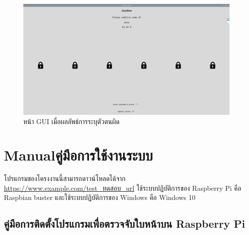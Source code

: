 \begin{figure}[!ht]
    \begin{center}
      \includegraphics[scale=.35]{pic/comfirm_page.png}
      \caption[หน้า GUI เมื่อผลลัพธ์การระบุตัวตนผิด]{หน้า GUI เมื่อผลลัพธ์การระบุตัวตนผิด}
      \label{fig:com_page}
    \end{center}
  \end{figure}
















\chapter{\ifenglish Manual\else คู่มือการใช้งานระบบ\fi}

โปรแกรมของโครงงานนี้สามารถดาวน์โหลดได้จาก \url{https://www.example.com/test_ทดสอบ_url} 
ใช้ระบบปฏิบัติการของ Raspberry Pi คือ Raspbian buster และใช้ระบบปฏิบัติการของ Windows คือ Windows 10

\section{คู่มือการติดตั้งโปรแกรมเพื่อตรวจจับใบหน้าบน Raspberry Pi}
